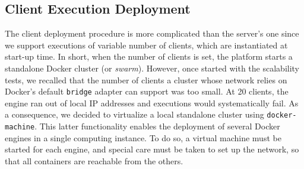 \subsection{Client Execution Deployment} \label{sec:deployment:client}

The client deployment procedure is more complicated than the server's one since we support executions of variable number of clients, which are instantiated at start-up time.
In short, when the number of clients is set, the platform starts a standalone Docker cluster (or \emph{swarm}).
However, once started with the scalability tests, we recalled that the number of clients a cluster whose network relies on Docker's default \texttt{bridge} adapter can support was too small.
At 20 clients, the engine ran out of local IP addresses and executions would systematically fail.
As a consequence, we decided to virtualize a local standalone cluster using \texttt{docker-machine}.
This latter functionality enables the deployment of several Docker engines in a single computing instance.
To do so, a virtual machine must be started for each engine, and special care must be taken to set up the network, so that all containers are reachable from the others.


